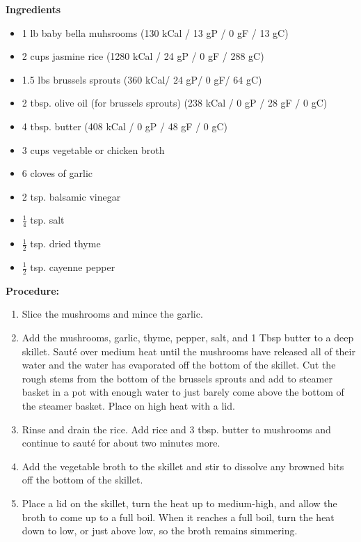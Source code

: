 \begin{multicols}{2}
\textbf{Ingredients}
\begin{itemize}
\item 1 lb baby bella muhsrooms \newline (130 kCal / 13 gP / 0 gF / 13 gC)
\item 2 cups jasmine rice \quad (1280 kCal / 24 gP / 0 gF / 288 gC)
\item 1.5 lbs brussels sprouts (360 kCal/ 24 gP/ 0 gF/ 64 gC)
\item 2 tbsp. olive oil (for brussels sprouts) \newline (238 kCal / 0 gP / 28 gF / 0 gC)
\item 4 tbsp. butter \quad (408 kCal / 0 gP / 48 gF / 0 gC)
\item 3 cups vegetable or chicken broth
\item 6 cloves of garlic
\item 2 tsp. balsamic vinegar
\item $\frac{1}{4}$ tsp. salt
\item $\frac{1}{2}$ tsp. dried thyme
\item $\frac{1}{2}$ tsp. cayenne pepper



\end{itemize}


\columnbreak
\textbf{Procedure:}
\medskip


\begin{enumerate}

\item Slice the mushrooms and mince the garlic.
\item Add the mushrooms, garlic, thyme, pepper, salt, and 1 Tbsp butter to a deep skillet. Sauté over medium heat until the mushrooms have released all of their water and the water has evaporated off the bottom of the skillet. Cut the rough stems from the bottom of the brussels sprouts and add to steamer basket in a pot with enough water to just barely come above the bottom of the steamer basket. Place on high heat with a lid. 
\item Rinse and drain the rice. Add rice and 3 tbsp. butter to mushrooms and continue to sauté for about two minutes more. 
\item Add the vegetable broth to the skillet and stir to dissolve any browned bits off the bottom of the skillet. 
\item Place a lid on the skillet, turn the heat up to medium-high, and allow the broth to come up to a full boil. When it reaches a full boil, turn the heat down to low, or just above low, so the broth remains simmering. 


\end{enumerate}
\end{multicols}
